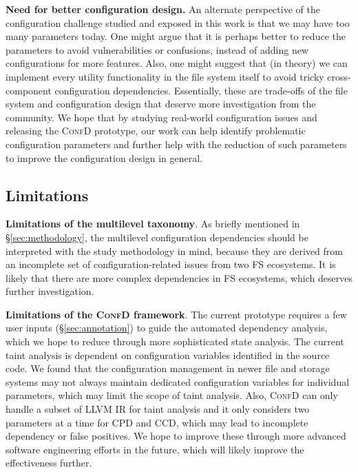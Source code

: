 \vspace{0.05in}
\noindent
\textbf{Need for better configuration design.}
An alternate perspective of the configuration challenge studied and exposed in this work is that we may have too many parameters today. One might argue that  it is perhaps better to reduce the parameters to avoid  vulnerabilities or confusions, instead of adding new configurations for more features. 
Also, one might suggest that (in theory) we can implement every utility functionality in  the file system itself 
to avoid  tricky cross-component configuration dependencies.
Essentially, these are trade-offs of the file system and configuration design that deserve more investigation from the community. We hope that by studying real-world configuration issues and releasing the \textsc{ConfD} prototype, our work can help {identify problematic configuration parameters and further help with the reduction of such parameters to} improve the configuration design  in general.\\

\vspace{-0.15in}
\subsection{Limitations}
\noindent
{\bf Limitations of the multilevel taxonomy}. As briefly mentioned in \S\ref{sec:methodology}, the multilevel configuration dependencies should be interpreted with the study methodology in mind, 
because they are derived from an incomplete set of configuration-related issues from two FS ecosystems. It is likely that there are more complex dependencies in  FS ecosystems, which deserves further investigation. 
 
\vspace{0.05in}
\noindent
{\bf Limitations of the \textsc{ConfD} framework}.
The current prototype 
requires a few user inputs (\S\ref{sec:annotation}) to guide the automated dependency analysis, which we hope to reduce  through more sophisticated state analysis.
The current taint analysis is dependent on configuration variables identified in the source code. We found that the configuration management in newer file and storage systems may not always maintain dedicated configuration variables for individual parameters, which may limit the scope of taint analysis.
Also,  \textsc{ConfD}  can only handle a subset of   LLVM  IR   for taint analysis and it only considers two parameters at a time for CPD and CCD, which may lead to incomplete dependency or false positives. 
We hope to improve these  through more advanced software engineering efforts in the future, which will likely improve the   effectiveness further. 

